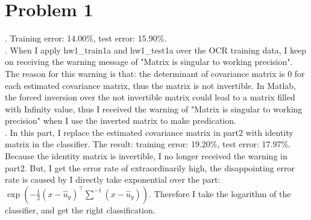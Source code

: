\documentclass[twoside,11pt]{homework}
\begin{document}
\maketitle

\section*{Problem 1}
.   Training error:  14.00\%,   test error: 15.90\%.\\

.   When I apply hw1\_train1a and hw1\_test1a over the OCR training data, I keep on receiving the warning message of "Matrix is singular to working precision".  The reason for this warning is that: the determinant of covariance matrix is 0 for each estimated covariance matrix, thus the matrix is not invertible. In Matlab, the forced inversion over the not invertible matrix could lead to a matrix filled with Infinity value, thus I received the warning of "Matrix is singular to working precision" when I use the inverted matrix to make predication.\\

.  In this part, I replace the estimated covariance matrix in part2 with identity matrix in the classifier. The result: training error: 19.20\%, test error: 17.97\%. Because the identity matrix is invertible, I no longer received the warning in part2. But,  I get the error rate of extraordinarily  high, the disappointing error rate is caused by I directly take exponential over the part:
$\exp(-\frac{1}{2}(x - \hat{u}_y)^\top \sum ^ {-1}(x - \hat{u}_y))$.  Therefore I take the logarithm of the classifier, and get the right classification. 

\end{document}
